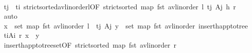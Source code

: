 \begin{isabellebody}
\ \ \ \ \ \ \ \ \isamarkupfalse%
\ {\isacartoucheopen}t\isactrlsub j\ {\isacharless}{\kern0pt}\ t\isactrlsub i{\isacartoucheclose}\ strict{\isacharunderscore}{\kern0pt}sorted{\isacharunderscore}{\kern0pt}avl{\isacharunderscore}{\kern0pt}inorder{\isacharunderscore}{\kern0pt}l{\isacharbrackleft}{\kern0pt}OF\ {\isacartoucheopen}strict{\isacharunderscore}{\kern0pt}sorted\ {\isacharparenleft}{\kern0pt}map\ fst\ {\isacharparenleft}{\kern0pt}avl{\isacharunderscore}{\kern0pt}inorder\ {\isasymlangle}l{\isacharcomma}{\kern0pt}\ {\isacharparenleft}{\kern0pt}{\isacharparenleft}{\kern0pt}t\isactrlsub j{\isacharcomma}{\kern0pt}\ A\isactrlsub j{\isacharparenright}{\kern0pt}{\isacharcomma}{\kern0pt}\ h{\isacharparenright}{\kern0pt}{\isacharcomma}{\kern0pt}\ r{\isasymrangle}{\isacharparenright}{\kern0pt}{\isacharparenright}{\kern0pt}{\isacartoucheclose}{\isacharbrackright}{\kern0pt}\ \isamarkupfalse%
\ auto\isanewline
\ \ \ \ \ \ \isamarkupfalse%
\ \isamarkupfalse%
\ {\isachardoublequoteopen}{\isasymforall}x\ {\isasymin}\ set\ {\isacharparenleft}{\kern0pt}map\ fst\ {\isacharparenleft}{\kern0pt}avl{\isacharunderscore}{\kern0pt}inorder\ l\ {\isacharat}{\kern0pt}\ {\isacharbrackleft}{\kern0pt}{\isacharparenleft}{\kern0pt}t\isactrlsub j{\isacharcomma}{\kern0pt}\ A\isactrlsub j{\isacharparenright}{\kern0pt}{\isacharbrackright}{\kern0pt}{\isacharparenright}{\kern0pt}{\isacharparenright}{\kern0pt}{\isachardot}{\kern0pt}\ {\isasymforall}y\ {\isasymin}\ set\ {\isacharparenleft}{\kern0pt}map\ fst\ {\isacharparenleft}{\kern0pt}avl{\isacharunderscore}{\kern0pt}inorder\ {\isacharparenleft}{\kern0pt}insert{\isacharunderscore}{\kern0pt}happ{\isacharunderscore}{\kern0pt}to{\isacharunderscore}{\kern0pt}tree\ {\isacharparenleft}{\kern0pt}t\isactrlsub i{\isacharcomma}{\kern0pt}A\isactrlsub i{\isacharparenright}{\kern0pt}\ r{\isacharparenright}{\kern0pt}{\isacharparenright}{\kern0pt}{\isacharparenright}{\kern0pt}{\isachardot}{\kern0pt}\ x\ {\isacharless}{\kern0pt}\ y{\isachardoublequoteclose}\isanewline
\ \ \ \ \ \ \ \ \isamarkupfalse%
\ insert{\isacharunderscore}{\kern0pt}happ{\isacharunderscore}{\kern0pt}to{\isacharunderscore}{\kern0pt}tree{\isacharunderscore}{\kern0pt}set{\isacharbrackleft}{\kern0pt}OF\ {\isacartoucheopen}strict{\isacharunderscore}{\kern0pt}sorted\ {\isacharparenleft}{\kern0pt}map\ fst\ {\isacharparenleft}{\kern0pt}avl{\isacharunderscore}{\kern0pt}inorder\ r{\isacharparenright}{\kern0pt}{\isacharparenright}{\kern0pt}{\isacartoucheclose}{\isacharbrackright}{\kern0pt}\ \isamarkupfalse%

\end{isabellebody}
